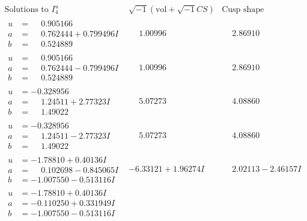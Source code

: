 \documentclass[1p]{elsarticle_modified}
\theoremstyle{definition}
\newcommand{\I}{\sqrt{-1}}
\begin{document}
$$\begin{array}{c|c|c}  
\text{Solutions to }I^u_{4}& \I (\text{vol} + \sqrt{-1}CS) & \text{Cusp shape}\\
 \hline 
\begin{aligned}
u &= \phantom{-}0.905166\phantom{ +0.000000I} \\
a &= \phantom{-}0.762444 + 0.799496 I \\
b &= \phantom{-}0.524889\phantom{ +0.000000I}\end{aligned}
 & \phantom{-}1.00996\phantom{ +0.000000I} & \phantom{-}2.86910\phantom{ +0.000000I} \\ \hline\begin{aligned}
u &= \phantom{-}0.905166\phantom{ +0.000000I} \\
a &= \phantom{-}0.762444 - 0.799496 I \\
b &= \phantom{-}0.524889\phantom{ +0.000000I}\end{aligned}
 & \phantom{-}1.00996\phantom{ +0.000000I} & \phantom{-}2.86910\phantom{ +0.000000I} \\ \hline\begin{aligned}
u &= -0.328956\phantom{ +0.000000I} \\
a &= \phantom{-}1.24511 + 2.77323 I \\
b &= \phantom{-}1.49022\phantom{ +0.000000I}\end{aligned}
 & \phantom{-}5.07273\phantom{ +0.000000I} & \phantom{-}4.08860\phantom{ +0.000000I} \\ \hline\begin{aligned}
u &= -0.328956\phantom{ +0.000000I} \\
a &= \phantom{-}1.24511 - 2.77323 I \\
b &= \phantom{-}1.49022\phantom{ +0.000000I}\end{aligned}
 & \phantom{-}5.07273\phantom{ +0.000000I} & \phantom{-}4.08860\phantom{ +0.000000I} \\ \hline\begin{aligned}
u &= -1.78810 + 0.40136 I \\
a &= \phantom{-}0.102698 - 0.845065 I \\
b &= -1.007550 - 0.513116 I\end{aligned}
 & -6.33121 + 1.96274 I & \phantom{-}2.02113 - 2.46157 I \\ \hline\begin{aligned}
u &= -1.78810 + 0.40136 I \\
a &= -0.110250 + 0.331949 I \\
b &= -1.007550 - 0.513116 I\end{aligned}

\end{array}$$
\end{document}
